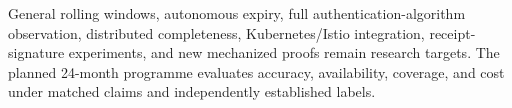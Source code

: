 \documentclass[10pt,a4paper]{article}
\begin{document}
General rolling windows, autonomous expiry, full authentication-algorithm observation, distributed completeness, Kubernetes/Istio integration, receipt-signature experiments, and new mechanized proofs remain research targets. The planned 24-month programme evaluates accuracy, availability, coverage, and cost under matched claims and independently established labels.
\end{document}

